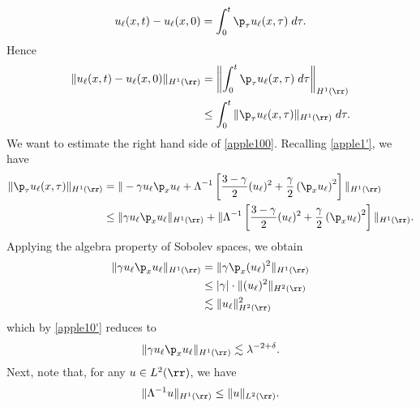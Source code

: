 \begin{equation*}
	u_\ell(x,t) - u_\ell(x,0) = \int_0^t \p_\tau u_\ell(x,\tau) \; d \tau.
\end{equation*}
Hence
\begin{equation}
	\begin{split}
		\|u_\ell(x,t) - u_\ell(x,0)\|_{H^1(\rr)}
		& = \left \| \int_0^t \p_\tau
		u_\ell(x,\tau) \; d \tau \right \|_{H^1(\rr)}
		\\
		& \le  \int_0^t \|\p_\tau u_\ell (x,\tau) \|_{H^1(\rr)} \; d \tau.
		\label{apple100}
	\end{split}
\end{equation}
We want to estimate the right hand side of \eqref{apple100}. Recalling
\eqref{apple1'}, we have
\begin{equation}
	\label{apple101}
	\begin{split}
		\|\p_\tau u_\ell(x,\tau) \|_{H^1(\rr)}
		& =  \|-\gamma u_\ell \p_x u_\ell + \Lambda^{-1} \left[
		\frac{3-\gamma}{2}(u_\ell)^2 + \frac{\gamma}{2} \left( \p_x u_\ell \right)^2
		\right] \|_{H^1(\rr)}
		\\
		& \le \|\gamma u_\ell \p_x u_\ell \|_{H^1(\rr)} + \|\Lambda^{-1} \left[
		\frac{3-\gamma}{2} (u_\ell)^2 + \frac{\gamma}{2} \left( \p_x u_\ell \right)^2
		\right] \|_{H^1(\rr)}.
	\end{split}
\end{equation}
Applying the algebra property of Sobolev spaces, we obtain
\begin{equation*}
	\begin{split}
		\|\gamma u_\ell \p_x u_\ell \|_{H^1(\rr)} &
		= \|\gamma \p_x (u_\ell)^2 \|_{H^1(\rr)}
		\\
		& \le |\gamma| \cdot \| (u_\ell)^2 \|_{H^2(\rr)}
		\\
		& \lesssim \|u_\ell\|_{H^2(\rr)}^2
	\end{split}
\end{equation*}
which by \eqref{apple10'} reduces to
\begin{equation}
	\begin{split}
		\|\gamma u_\ell \p_x u_\ell \|_{H^1(\rr)} \lesssim \lambda^{-2 + \delta}.
		\label{apple102}
	\end{split}
\end{equation}
Next, note that, for any $u \in L^2(\rr)$, we
have
\begin{equation}
	\begin{split}
		\|\Lambda^{-1} u \|_{H^1(\rr)} 
		\le \|u\|_{L^2(\rr)}.
		\label{apple27}
	\end{split}
\end{equation}
